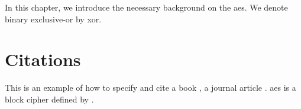 \lipsum

In this chapter, we introduce the necessary background on the \gls{aes}.
We denote binary exclusive-or by \gls{xor}.

\section{Citations}

\lipsum

\label{sec:bib}
This is an example of how to specify and cite
a book \cite{AESbook},
a journal article \cite{bstjShannon49}.
\Gls{aes} is a block cipher defined by \textcite{AESbook}.
